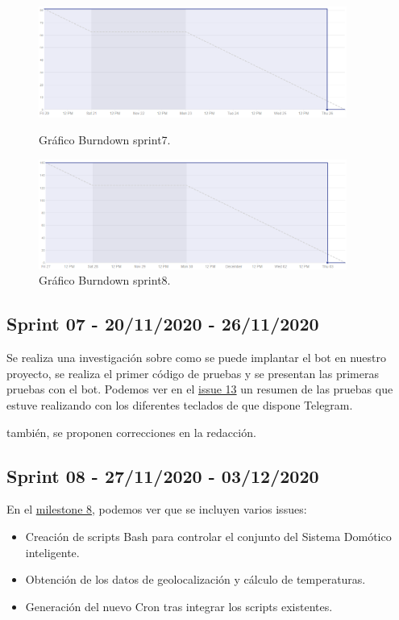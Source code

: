 \begin{figure}
    \centering
    \includegraphics[width=0.9\textwidth]{img/BurnDown/7.PNG}
    \caption{Gráfico Burndown sprint7. } \label{BD5}
    \includegraphics[width=0.9\textwidth]{img/BurnDown/8.PNG}
    \caption{Gráfico Burndown sprint8. } \label{BD6}
\end{figure}

\subsection{Sprint 07 - 20/11/2020 - 26/11/2020}
Se realiza una investigación sobre como se puede implantar el bot en nuestro proyecto, se realiza el primer código de pruebas y se presentan las primeras pruebas con el bot. Podemos ver en el \href{https://github.com/davidelinformatico/TFG/issues/13}{issue 13} un resumen de las pruebas que estuve realizando con los diferentes teclados de que dispone Telegram.

también, se proponen correcciones en la redacción.

\subsection{Sprint 08 - 27/11/2020 - 03/12/2020}
En el \href{https://github.com/davidelinformatico/TFG/milestone/8?closed=1}{milestone 8}, podemos ver que se incluyen varios issues:

\begin{itemize}
    \item Creación de scripts Bash para controlar el conjunto del Sistema Domótico inteligente.
    \item Obtención de los datos de geolocalización y cálculo de temperaturas.
    \item Generación del nuevo Cron tras integrar los scripts existentes.
\end{itemize}

